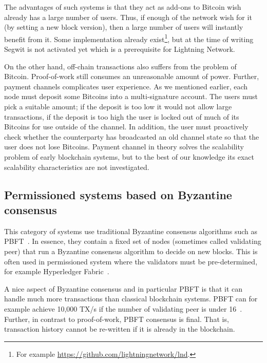 The advantages of such systems is that they act as add-ons to Bitcoin wish already has a large number of users.
Thus, if enough of the network wish for it (by setting a new block version),
then a large number of users will instantly benefit from it.
Some implementation already exist\footnote{For example \url{https://github.com/lightningnetwork/lnd}.},
but at the time of writing Segwit is not activated yet which is a prerequisite for Lightning Network.

On the other hand, off-chain transactions also suffers from the problem of Bitcoin.
Proof-of-work still consumes an unreasonable amount of power.
Further, payment channels complicates user experience.
As we mentioned earlier, each node must deposit some Bitcoins into a multi-signature account.
The users must pick a suitable amount;
if the deposit is too low it would not allow large transactions,
if the deposit is too high the user is locked out of much of its Bitcoins for use outside of the channel.
In addition, the user must proactively check whether the counterparty has broadcasted an old channel state so that the user does not lose Bitcoins.
Payment channel in theory solves the scalability problem of early blockchain systems,
but to the best of our knowledge its exact scalability characteristics are not investigated.



\subsection{Permissioned systems based on Byzantine consensus}

This category of systems use traditional Byzantine consensus algorithms such as PBFT~\cite{castro1999practical}.
In essence, they contain a fixed set of nodes (sometimes called validating peer) that run a Byzantine consensus algorithm to decide on new blocks.
This is often used in permissioned system where the validators must be pre-determined,
for example Hyperledger Fabric~\cite{cachin2016architecture}.

A nice aspect of Byzantine consensus and in particular PBFT is that it can handle much more transactions than classical blockchain systems.
PBFT can for example achieve 10,000 TX/s if the number of validating peer is under 16~\cite[Section 5.2]{miller2016honey}.
Further, in contrast to proof-of-work, PBFT consensus is final.
That is, transaction history cannot be re-written if it is already in the blockchain.

